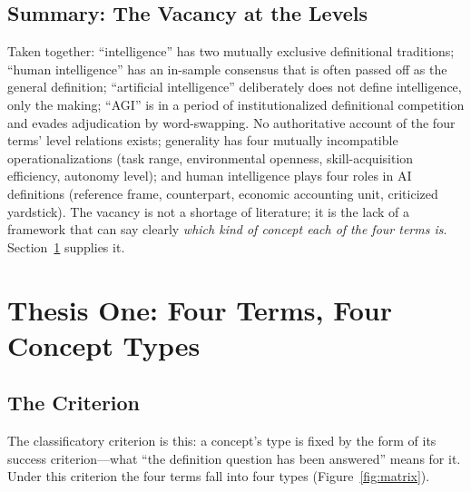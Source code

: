 \documentclass[10pt]{article}
\begin{document}
\subsection{Summary: The Vacancy at the Levels}

Taken together: ``intelligence'' has two mutually exclusive definitional traditions; ``human intelligence'' has an in-sample consensus that is often passed off as the general definition; ``artificial intelligence'' deliberately does not define intelligence, only the making; ``AGI'' is in a period of institutionalized definitional competition and evades adjudication by word-swapping. No authoritative account of the four terms' level relations exists; generality has four mutually incompatible operationalizations (task range, environmental openness, skill-acquisition efficiency, autonomy level); and human intelligence plays four roles in AI definitions (reference frame, counterpart, economic accounting unit, criticized yardstick). The vacancy is not a shortage of literature; it is the lack of a framework that can say clearly \emph{which kind of concept each of the four terms is}. Section~\ref{sec:types} supplies it.

\section{Thesis One: Four Terms, Four Concept Types}\label{sec:types}

\subsection{The Criterion}

The classificatory criterion is this: a concept's type is fixed by the form of its success criterion---what ``the definition question has been answered'' means for it. Under this criterion the four terms fall into four types (Figure~\ref{fig:matrix}).
\end{document}

